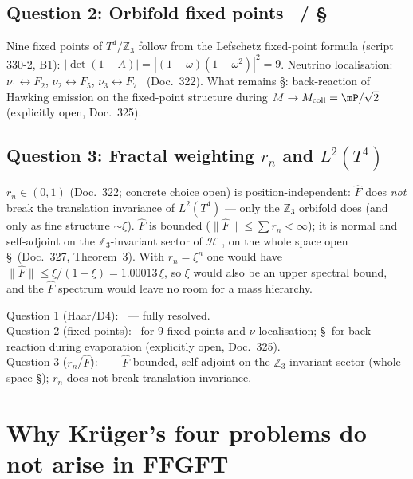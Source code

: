 \subsection{Question 2: Orbifold fixed points \K\ / \S}

Nine fixed points of $T^4/\mathbb{Z}_3$ follow from the Lefschetz
fixed-point formula (script 330-2, B1):
$|\det(1-A)| = |(1-\omega)(1-\omega^2)|^2 = 9$.
Neutrino localisation: $\nu_1\leftrightarrow F_2$,
$\nu_2\leftrightarrow F_5$, $\nu_3\leftrightarrow F_7$ \K\ (Doc.~322).
What remains \S: back-reaction of Hawking emission on the fixed-point
structure during $M\to M_\text{coll}=\mP/\sqrt{2}$ (explicitly open,
Doc.~325).

\subsection{Question 3: Fractal weighting $r_n$ and $L^2(T^4)$ \B}

$r_n \in (0,1)$ (Doc.~322; concrete choice open) is
position-independent: $\hat{F}$ does \emph{not}
break the translation invariance of $L^2(T^4)$ — only the
$\mathbb{Z}_3$ orbifold does (and only as fine structure $\sim\xi$).
$\hat{F}$ is bounded ($\|\hat{F}\|\leq\sum r_n<\infty$); it is normal
and self-adjoint on the $\mathbb{Z}_3$-invariant sector of $\mathcal{H}$
\B, on the whole space open \S\ (Doc.~327, Theorem~3).
With $r_n = \xi^n$ one would have $\|\hat F\| \le \xi/(1-\xi) = 1.00013\,\xi$,
so $\xi$ would also be an upper spectral bound, and the $\hat F$ spectrum
would leave no room for a mass hierarchy.

\begin{tcolorbox}[ffgftbox,title={Status of the three questions}]
  Question 1 (Haar/D4): \B\ — fully resolved.\\
  Question 2 (fixed points): \K\ for 9 fixed points and
  $\nu$-localisation; \S\ for back-reaction during evaporation
  (explicitly open, Doc.~325).\\
  Question 3 ($r_n$/$\hat{F}$): \B\ — $\hat{F}$ bounded, self-adjoint
  on the $\mathbb{Z}_3$-invariant sector (whole space \S);
  $r_n$ does not break translation invariance.
\end{tcolorbox}

\section{Why Krüger's four problems do not arise in FFGFT}
\label{sec:comparison}

